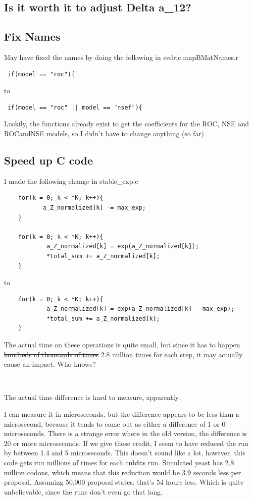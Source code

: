 \subsection{Is it worth it to adjust Delta a\_12?}

\subsection{Fix Names}

May have fixed the names by doing the following in cedric.mapBMatNames.r

\begin{verbatim}
 if(model == "roc"){
\end{verbatim}

to

\begin{verbatim}
 if(model == "roc" || model == "nsef"){
\end{verbatim}

Luckily, the functions already exist to get the coefficients for the ROC, NSE and ROCandNSE models, so I didn't have to change anything (so far)

\subsection{Speed up C code}

I made the following change in stable\_exp.c

\begin{verbatim}
	for(k = 0; k < *K; k++){
	       a_Z_normalized[k] -= max_exp;
	}

	for(k = 0; k < *K; k++){
	        a_Z_normalized[k] = exp(a_Z_normalized[k]);
	        *total_sum += a_Z_normalized[k];
	}
\end{verbatim}

to

\begin{verbatim}
	for(k = 0; k < *K; k++){
	        a_Z_normalized[k] = exp(a_Z_normalized[k] - max_exp);
	        *total_sum += a_Z_normalized[k];
	}
\end{verbatim}

The actual time on these operations is quite small, but since it has to happen \sout{hundreds of thousands of times} 2.8 million times for each step, it may actually cause an impact. Who knows?

~

The actual time difference is hard to measure, apparently.

I can measure it in microseconds, but the difference appears to be less than a microsecond, because it tends to come out as either a difference of 1 or 0 microseconds. There is a strange error where in the old version, the difference is 20 or more microseconds. If we give those credit, I seem to have reduced the run by between 1.4 and 5 microseconds. This doesn't sound like a lot, however, this code gets run millions of times for each cubfits run. Simulated yeast has 2.8 million codons, which means that this reduction would be 3.9 seconds less per proposal. Assuming 50,000 proposal states, that's 54 hours less. Which is quite unbelievable, since the runs don't even go that long.


